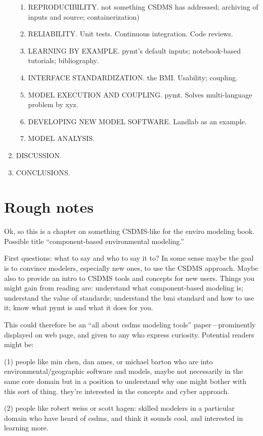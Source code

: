 \documentclass[12pt]{amsart}
\begin{document}
\begin{enumerate}
\begin{enumerate}
\item REPRODUCIBILITY. not something CSDMS has addressed; archiving of inputs and source; containerization)
\item RELIABILITY. Unit tests. Continuous integration. Code reviews.
\item LEARNING BY EXAMPLE. pymt's default inputs; notebook-based tutorials; bibliography.
\item INTERFACE STANDARDIZATION. the BMI. Usability; coupling.
\item MODEL EXECUTION AND COUPLING. pymt. Solves multi-language problem by xyz.
\item DEVELOPING NEW MODEL SOFTWARE. Landlab as an example.
\item MODEL ANALYSIS.
  \end{enumerate}
\item DISCUSSION.
\item CONCLUSIONS.
\end{enumerate}


\section*{Rough notes}

Ok, so this is a chapter on something CSDMS-like for the enviro modeling book. Possible title ``component-based environmental modeling.''

First questions: what to say and who to say it to? In some sense maybe the goal is to convince modelers, especially new ones, to use the CSDMS approach. Maybe also to provide an intro to CSDMS tools and concepts for new users. Things you might gain from reading are: understand what component-based modeling is; understand the value of standards; understand the bmi standard and how to use it; know what pymt is and what it does for you.

This could therefore be an ``all about csdms modeling tools'' paper---prominently displayed on web page, and given to any who express curiosity. Potential readers might be: 

(1) people like min chen, dan ames, or michael barton who are into environmental/geographic software and models, maybe not necessarily in the same core domain but in a position to understand why one might bother with this sort of thing. they're interested in the concepts and cyber approach.

(2) people like robert weiss or scott hagen: skilled modelers in a particular domain who have heard of csdms, and think it sounds cool, and interested in learning more.
\end{document}
